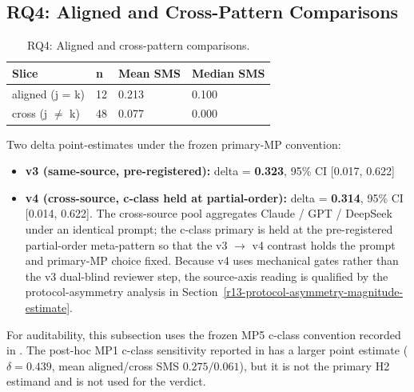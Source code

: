 \documentclass[manuscript,screen,review]{acmart}
\begin{document}
\subsection{RQ4: Aligned and Cross-Pattern Comparisons}\label{rq2-aligned-vs-cross-cliffs-delta}

{%
\begin{longtable}[]{@{}llll@{}}
\caption{RQ4: Aligned and cross-pattern comparisons.}\label{tab:p2-09}\\
\toprule\noalign{}
Slice & n & Mean SMS & Median SMS \\
\midrule\noalign{}
\endhead
\bottomrule\noalign{}
\endlastfoot
aligned (j = k) & 12 & 0.213 & 0.100 \\
cross (j $\neq$ k) & 48 & 0.077 & 0.000 \\
\end{longtable}
}

Two delta point-estimates under the frozen primary-MP
convention:

\begin{itemize}

\item
  \textbf{v3 (same-source, pre-registered):} delta = \textbf{0.323},
  95\% CI {[}0.017, 0.622{]}
\item
  \textbf{v4 (cross-source, c-class held at partial-order):} delta =
  \textbf{0.314}, 95\% CI {[}0.014, 0.622{]}. The cross-source pool
  aggregates Claude / GPT / DeepSeek under an identical prompt; the
  c-class primary is held at the pre-registered partial-order
  meta-pattern so that the v3 $\to$ v4
  contrast holds the prompt and primary-MP choice fixed. Because v4 uses
  mechanical gates rather than the v3 dual-blind reviewer step, the
  source-axis reading is qualified by the protocol-asymmetry analysis in
  Section~\ref{r13-protocol-asymmetry-magnitude-estimate}.
\end{itemize}

For auditability, this subsection uses the frozen MP5 c-class convention
recorded in . The
post-hoc MP1 c-class sensitivity reported in
 has a larger point estimate
(\(\delta=0.439\), mean aligned/cross SMS \(0.275/0.061\)), but it is
not the primary H2 estimand and is not used for the verdict.
\end{document}
